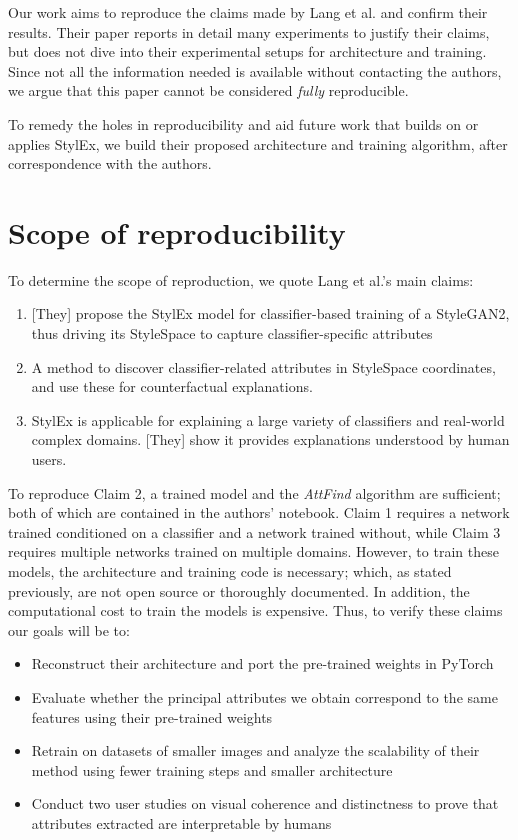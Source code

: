 Our work aims to reproduce the claims made by Lang et al. and confirm their results. Their paper reports in detail many experiments to justify their claims, but does not dive into their experimental setups for architecture and training. Since not all the information needed is available without contacting the authors, we argue that this paper cannot be considered \textit{fully} reproducible.

To remedy the holes in reproducibility and aid future work that builds on or applies StylEx, we build their proposed architecture and training algorithm, after correspondence with the authors.

\section{Scope of reproducibility}
\label{sec:claims}
To determine the scope of reproduction, we quote Lang et al.'s main claims:
\begin{enumerate}[label=\textbf{Claim \arabic*}]
    \item \label{itm:claim1} [They] propose the StylEx model for classifier-based training of a StyleGAN2, thus driving its StyleSpace to capture classifier-specific attributes
    \item \label{itm:claim2} A method to discover classifier-related attributes in StyleSpace coordinates, and use these for counterfactual explanations.
    \item \label{itm:claim3} StylEx is applicable for explaining a large variety of classifiers and real-world complex domains. [They] show it provides explanations understood by human users.
\end{enumerate}
To reproduce Claim 2, a trained model and the \textit{AttFind} algorithm are sufficient; both of which are contained in the authors' notebook. Claim 1 requires a network trained conditioned on a classifier and a network trained without, while Claim 3 requires multiple networks trained on multiple domains. However, to train these models, the architecture and training code is necessary; which, as stated previously, are not open source or thoroughly documented. In addition, the computational cost to train the models is expensive. Thus, to verify these claims our goals will be to:
\begin{itemize}
    \item Reconstruct their architecture and port the pre-trained weights in PyTorch
    \item Evaluate whether the principal attributes we obtain correspond to the same features using their pre-trained weights
    \item Retrain on datasets of smaller images and analyze the scalability of their method using fewer training steps and smaller architecture
    \item Conduct two user studies on visual coherence and distinctness to prove that attributes extracted are interpretable by humans
\end{itemize}

